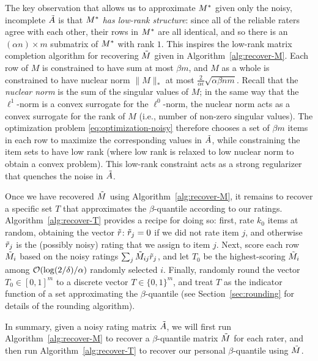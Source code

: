 The key observation that allows us to approximate $M^*$ given only the noisy, 
incomplete $\tilde{A}$ is that \emph{$M^*$ has low-rank structure}: since all 
of the reliable raters agree with each other, their rows in $M^*$ are all 
identical, and so there is an $(\alpha n) \times m$ submatrix of $M^*$ with 
rank $1$. This inspires the low-rank matrix completion algorithm for recovering 
$\tilde{M}$ given in Algorithm~\ref{alg:recover-M}. Each row of $M$ is constrained 
to have sum at most $\beta m$, and $M$ as a whole is constrained to have 
nuclear norm $\|M\|_*$ at most $\frac{2}{\alpha \epsilon}\sqrt{\alpha\beta nm}$. 
Recall that the \emph{nuclear norm} is the sum of the singular values of 
$M$; in the same way that the $\ell^1$-norm is a convex surrogate for the 
$\ell^0$-norm, the nuclear norm acts as a convex surrogate for the rank of $M$ 
(i.e., number of non-zero singular values). The optimization problem 
\eqref{eq:optimization-noisy} therefore chooses a set of $\beta m$ items in each 
row to maximize the corresponding values in $\tilde{A}$, while constraining the item 
sets to have low rank (where low rank is relaxed to low nuclear norm to obtain 
a convex problem). 
This low-rank constraint acts as a strong regularizer that quenches the noise 
in $\tilde{A}$.



Once we have recovered $\tilde{M}$ using Algorithm~\ref{alg:recover-M}, it remains to 
recover a specific set $T$ that approximates the $\beta$-quantile according to 
our ratings. Algorithm~\ref{alg:recover-T} provides a recipe for doing so: 
first, rate $k_0$ items at random, obtaining the vector $\tilde{r}$:
$\tilde{r}_j = 0$ if we did not rate item $j$, and otherwise $\tilde{r}_j$ is 
the (possibly noisy) rating that we assign to item $j$. Next, score each 
row $\tilde{M}_{i}$ based on the noisy ratings $\sum_j \tilde{M}_{ij}\tilde{r}_j$, and let 
$T_0$ be the highest-scoring $\tilde{M}_i$ among $\mathcal{O}(\log(2/\delta)/\alpha)$ randomly 
selected $i$.
Finally, randomly round the vector $T_0 \in [0,1]^m$ to 
a discrete vector $T \in \{0,1\}^m$, and treat $T$ as the indicator function 
of a set approximating the $\beta$-quantile
(see Section~\ref{sec:rounding} for details of the rounding algorithm).

In summary, given a noisy rating matrix $\tilde{A}$, we will first run 
Algorithm~\ref{alg:recover-M} to recover a $\beta$-quantile matrix $\tilde{M}$ for 
each rater, and then run Algorithm~\ref{alg:recover-T} to recover our 
personal $\beta$-quantile using $\tilde{M}$.

